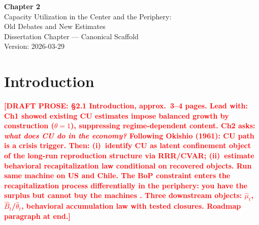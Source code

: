 \documentclass[12pt,letterpaper]{article}
\newcommand{\draftnote}[1]{%
  \textcolor{red}{\textbf{[DRAFT PROSE: #1]}}}
\begin{document}
\begin{titlepage}
  \vspace*{2cm}
  \begin{center}
    {\Large \textbf{Chapter 2}}\\[0.5em]
    {\large Capacity Utilization in the Center and the Periphery:\\
    Old Debates and New Estimates}\\[2em]
    {\normalsize Dissertation Chapter — Canonical Scaffold}\\[0.5em]
    {\normalsize Version: 2026-03-29}
  \end{center}
  \vspace{1cm}
  \begin{abstract}
    \draftnote{Abstract: 150--200 words. State: (1)~the structural deficiency
    of existing CU estimates and why it matters for crisis theory; (2)~the
    RRR/CVAR identification strategy and what it recovers; (3)~the behavioral
    recapitalization law and its nested closures; (4)~the Tavares peripheral
    twist as the chapter's distinctive contribution; (5)~the three downstream
    objects inherited by Ch3.}
  \end{abstract}
\end{titlepage}

\doublespacing

\section{Introduction}
\label{sec:intro}
%
%

\draftnote{§2.1 Introduction, approx.~3--4 pages.
  Lead with: Ch1 showed existing CU estimates impose balanced growth
  by construction ($\theta=1$), suppressing regime-dependent content.
  Ch2 asks: \emph{what does CU do in the economy?}
  Following Okishio (1961): CU path is a crisis trigger.
  Then: (i)~identify CU as latent confinement object of the long-run
  reproduction structure via RRR/CVAR; (ii)~estimate behavioral
  recapitalization law conditional on recovered objects.
  Run same machine on US and Chile. The BoP constraint enters the
  recapitalization process differentially in the periphery: you have
  the surplus but cannot buy the machines \citep{tavares1985}.
  Three downstream objects: $\hat{\mu}_t$, $\hat{B}_t$/$\hat{\theta}_t$,
  behavioral accumulation law with tested closures.
  Roadmap paragraph at end.}
\end{document}
